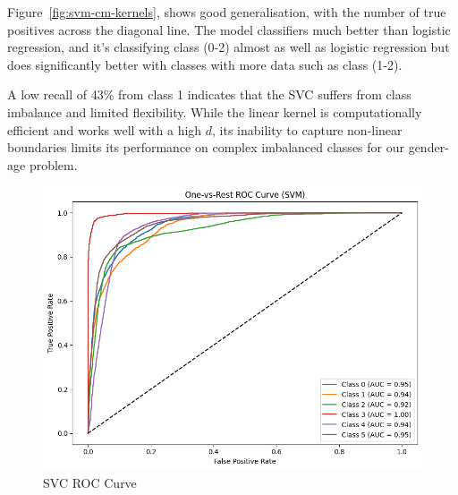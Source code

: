 \documentclass[10pt,twocolumn]{article}
\begin{document}
Figure~\ref{fig:svm-cm-kernels}, shows good generalisation, with the number of true positives across the diagonal line. The model classifiers much better than logistic regression, and it's classifying class (0-2) almost as well as logistic regression but does significantly better with classes with more data such as class (1-2).
\begin{table}[H]
\centering
\caption{Classification Report (linear kernel)}
\label{tab:classification-77-accuracy}
\end{table}
A low recall of 43\% from class 1 indicates that the SVC suffers from class imbalance and limited flexibility. While the linear kernel is computationally efficient and works well with a high $d$, its inability to capture non-linear boundaries limits its performance on complex imbalanced classes for our gender-age problem. 

\begin{figure}[H]
    \centering
    \includegraphics[width=1\linewidth]{images/svm/svm-roc-linear-vs-kernel-and-regularisation.png}
    \caption{SVC ROC Curve}
    \label{fig:svm-roc-kernels}
\end{figure}
\end{document}
